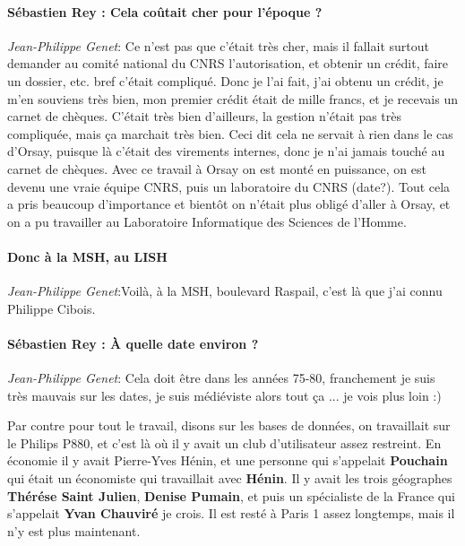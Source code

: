 \paragraph*{Sébastien Rey : Cela coûtait cher pour l'époque ?}

\noindent\emph{Jean-Philippe Genet}: Ce n’est pas que c'était très cher, mais il fallait surtout demander au comité national du CNRS l'autorisation, et obtenir un crédit, faire un dossier, etc. bref c'était compliqué. Donc je l'ai fait, j'ai obtenu un crédit, je m'en souviens très bien, mon premier crédit était de mille francs, et je recevais un carnet de chèques. C'était très bien d'ailleurs, la gestion n'était pas très compliquée, mais ça marchait très bien. Ceci dit cela ne servait à rien dans le cas d'Orsay, puisque là c'était des virements internes, donc je n’ai jamais touché au carnet de chèques. Avec ce travail à Orsay on est monté en puissance, on est devenu une vraie équipe CNRS,  puis un laboratoire du CNRS (date?). Tout cela a pris beaucoup d'importance et bientôt on n'était plus obligé d'aller à Orsay, et on a pu travailler au Laboratoire Informatique des Sciences de l'Homme.

\paragraph*{Donc à la MSH, au LISH}

\noindent\emph{Jean-Philippe Genet}:Voilà, à la MSH, boulevard Raspail, c'est là que j'ai connu Philippe Cibois.

\paragraph*{Sébastien Rey : À quelle date environ ? }

\noindent\emph{Jean-Philippe Genet}: Cela doit être dans les années 75-80, franchement je suis très mauvais sur les dates, je suis médiéviste alors tout ça ... je vois plus loin :)

Par contre pour tout le travail, disons sur les bases de données, on travaillait sur le Philips P880, et c'est là où il y avait un club d'utilisateur assez restreint. En économie il y avait Pierre-Yves Hénin, et une personne qui s'appelait \textbf{Pouchain} qui était un économiste qui travaillait avec \textbf{Hénin}. Il y avait les trois géographes \textbf{Thérése Saint Julien}, \textbf{Denise Pumain}, et puis un spécialiste de la France qui s'appelait \textbf{Yvan Chauviré} je crois. Il est resté à Paris 1 assez longtemps, mais il n'y est plus maintenant.



